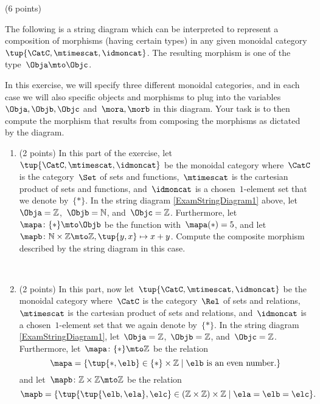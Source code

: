 \documentclass[paper=8.125in:10.250in,pagesize=pdftex,
    headinclude=false,footinclude=false,oneside,egregdoesnotlikesansseriftitles]{kaobook}
\begin{document}
\begin{gradedexercise}\label{ex:StringDiagrams} (6 points) 

The following is a string diagram which can be interpreted to represent a composition of morphisms (having certain types) in any given monoidal category~$\tup{\CatC,\mtimescat,\idmoncat}$.
The resulting morphism is one of the type~$\Obja \mto \Objc$.

\begin{center}
    \label{eq:ExamStringDiagram1}
\end{center}

In this exercise, we will specify three different monoidal categories, and in each case we will also specific objects and morphisms to plug into the variables~$\Obja, \Objb, \Objc$ and~$\mora, \morb$ in this diagram.
Your task is to then compute the morphism that results from composing the morphisms as dictated by the diagram.

\begin{enumerate}
\item (2 points) In this part of the exercise, let~$\tup{\CatC,\mtimescat,\idmoncat}$ be the monoidal category where~$\CatC$ is the category~$\Set$ of sets and functions,~$\mtimescat$ is the cartesian product of sets and functions, and~$\idmoncat$ is a chosen~$1$-element set that we denote by~$\{ * \}$.
In the string diagram \cref{ExamStringDiagram1} above, let~$\Obja = \mathbb{Z}$,~$\Objb = \mathbb{N}$, and~$\Objc = \mathbb{Z}$.
Furthermore, let~$\mapa\colon \{ * \} \mto \Objb$ be the function with~$\mapa(*) = 5$, and let~$\mapb \colon \mathbb{N} \times \mathbb{Z} \mto \mathbb{Z}, \tup{y, x} \mapsto x + y$.
Compute the composite morphism described by the string diagram in this case.

\

\item (2 points) In this part, now let~$\tup{\CatC,\mtimescat,\idmoncat}$ be the monoidal category where~$\CatC$ is the category~$\Rel$ of sets and relations,~$\mtimescat$ is the cartesian product of sets and relations, and~$\idmoncat$ is a chosen~$1$-element set that we again denote by~$\{ * \}$.
In the string diagram \cref{ExamStringDiagram1}, let~$\Obja = \mathbb{Z}$,~$\Objb = \mathbb{Z}$, and~$\Objc = \mathbb{Z}$.
Furthermore, let~$\mapa\colon \{ * \} \mto \mathbb{Z}$ be the relation
\begin{equation*}
\mapa = \{ \tup{*, \elb} \in \{ *\} \times \mathbb{Z} \mid \elb \text{ is an even number.} \}
\end{equation*}
and let~$\mapb \colon \mathbb{Z} \times \mathbb{Z} \mto \mathbb{Z}$ be the relation
\begin{equation*}
\mapb = \{ \tup{\tup{\elb, \ela}, \elc} \in (\mathbb{Z} \times \mathbb{Z}) \times \mathbb{Z} \mid \ela = \elb = \elc \}.
\end{equation*}


\end{enumerate}
\end{gradedexercise}
\end{document}
